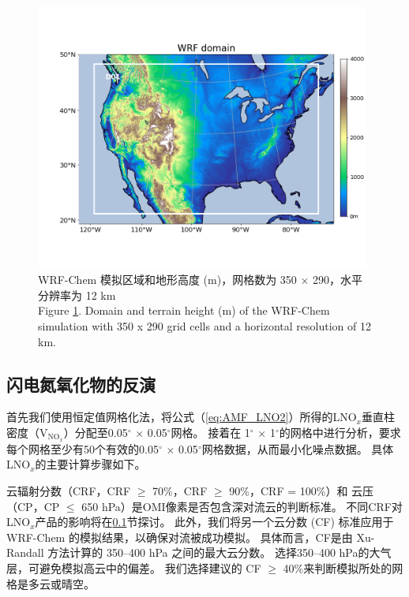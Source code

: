 \begin{figure}[htbp]
\centering
\includegraphics[width=11cm]{./figures/us_domain.png}
\caption{WRF-Chem 模拟区域和地形高度 (m)，网格数为 350 $\times$ 290，水平分辨率为 12 km \\
Figure \ref{fig:us_domain}. Domain and terrain height (m) of the WRF-Chem simulation with 350 x 290 grid cells and a horizontal resolution of 12 km.}
\label{fig:us_domain}
\end{figure}


\subsection{闪电氮氧化物的反演} \label{subsec:retrieval_polluted}

首先我们使用恒定值网格化法，将公式（\ref{eq:AMF_LNO2}）所得的LNO$_x$垂直柱密度（V$_{\textrm{NO$_x$}}$）分配至0.05$^{\circ}$ $\times$ 0.05$^{\circ}$网格\citep{Kuhlmann.2014}。
接着在 1$^{\circ}$ $\times$ 1$^{\circ}$的网格中进行分析，要求每个网格至少有50个有效的0.05$^{\circ}$ $\times$ 0.05$^{\circ}$网格数据，从而最小化噪点数据。
具体LNO$_x$的主要计算步骤如下。

云辐射分数（CRF，CRF $\geq$ 70\%，CRF $\geq$ 90\%，CRF = 100\%）和 云压（CP，CP $\leq$ 650 hPa）是OMI像素是否包含深对流云的判断标准\citep{Ziemke.2009,Choi.2014,Pickering.2016}。
不同CRF对LNO$_x$产品的影响将在\ref{subsec:retrieval_polluted}节探讨。
此外，我们将另一个云分数 (CF) 标准应用于 WRF-Chem 的模拟结果，以确保对流被成功模拟。
具体而言，CF是由 Xu-Randall 方法计算的 350--400 hPa 之间的最大云分数\citep{Xu.1996,Strode.2017}。
选择350--400 hPa的大气层，可避免模拟高云中的偏差。
我们选择\citet{Strode.2017}建议的 CF $\geq$ 40\%来判断模拟所处的网格是多云或晴空。

